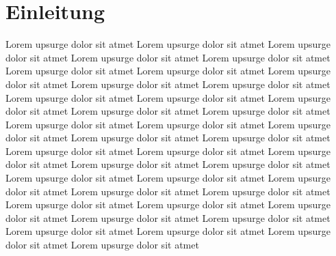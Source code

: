 \section{Einleitung}

Lorem upsurge dolor sit atmet Lorem upsurge dolor sit atmet Lorem upsurge dolor sit atmet Lorem upsurge dolor sit atmet Lorem upsurge dolor sit atmet Lorem upsurge dolor sit atmet Lorem upsurge dolor sit atmet Lorem upsurge dolor sit atmet Lorem upsurge dolor sit atmet Lorem upsurge dolor sit atmet Lorem upsurge dolor sit atmet Lorem upsurge dolor sit atmet Lorem upsurge dolor sit atmet Lorem upsurge dolor sit atmet Lorem upsurge dolor sit atmet Lorem upsurge dolor sit atmet Lorem upsurge dolor sit atmet Lorem upsurge dolor sit atmet Lorem upsurge dolor sit atmet Lorem upsurge dolor sit atmet Lorem upsurge dolor sit atmet Lorem upsurge dolor sit atmet Lorem upsurge dolor sit atmet Lorem upsurge dolor sit atmet Lorem upsurge dolor sit atmet Lorem upsurge dolor sit atmet Lorem upsurge dolor sit atmet Lorem upsurge dolor sit atmet Lorem upsurge dolor sit atmet Lorem upsurge dolor sit atmet Lorem upsurge dolor sit atmet Lorem upsurge dolor sit atmet Lorem upsurge dolor sit atmet Lorem upsurge dolor sit atmet Lorem upsurge dolor sit atmet Lorem upsurge dolor sit atmet Lorem upsurge dolor sit atmet Lorem upsurge dolor sit atmet Lorem upsurge dolor sit atmet